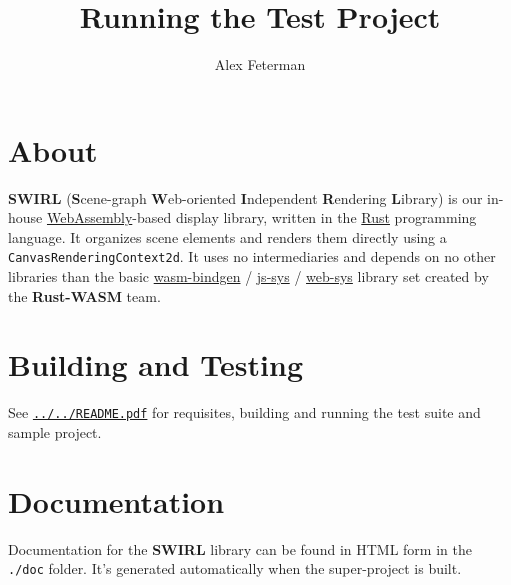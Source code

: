 \documentclass[11pt]{article}
\author{Alex Feterman}
\title{Running the Test Project}
\newcommand{\link}[2]{\textcolor{darkteal}{\href{#1}{#2}}}
\newcommand{\filepath}[1]{\colorbox{superlightyellow}{\texttt{#1}}}
\begin{document}
\section*{About}
\textbf{SWIRL} (\textbf{S}cene-graph \textbf{W}eb-oriented \textbf{I}ndependent
\textbf{R}endering \textbf{L}ibrary) is our in-house
\link{https://webassembly.org/}{WebAssembly}-based display library, written in the
\link{https://www.rust-lang.org/}{Rust} programming language. It organizes scene
elements and renders them directly using a \texttt{CanvasRenderingContext2d}. It uses
no intermediaries and depends on no other libraries than the basic
\link{https://crates.io/crates/wasm-bindgen}{wasm-bindgen} / \!\!
\link{https://crates.io/crates/js-sys}{js-sys} / \!\!
\link{https://crates.io/crates/web-sys}{web-sys} library set created by the
\textbf{Rust-WASM} team.\\
\section*{Building and Testing}
See \filepath{\link{../../README.pdf}{../../README.pdf}} for requisites, building and running
the test suite and sample project.\\
\section*{Documentation}
Documentation for the \textbf{SWIRL} library can be found in HTML form in the \filepath{./doc}
folder. It's generated automatically when the super-project is built.
\end{document}
